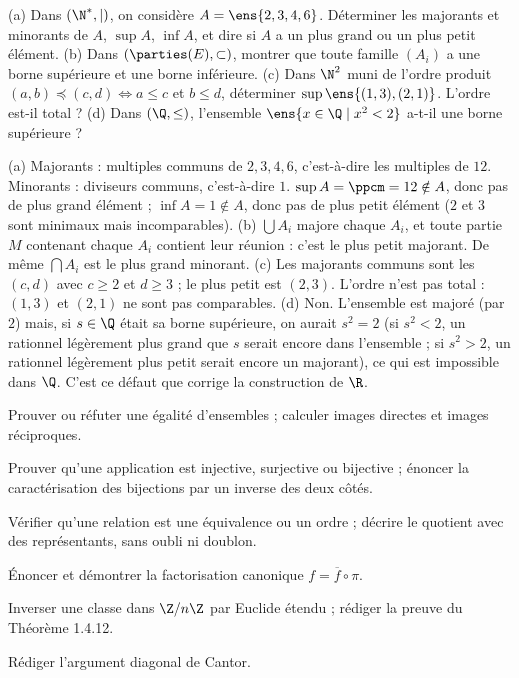 \begin{exo}
(a) Dans $(\N^*,\mid)$, on considère $A=\ens{2,3,4,6}$. Déterminer les majorants et minorants de $A$, $\sup A$, $\inf A$, et dire si $A$ a un plus grand ou un plus petit élément.
(b) Dans $(\parties(E),\subset)$, montrer que toute famille $(A_i)$ a une borne supérieure et une borne inférieure.
(c) Dans $\N^2$ muni de l'ordre produit $(a,b)\preceq(c,d)\iff a\le c$ et $b\le d$, déterminer $\sup\ens{(1,3),(2,1)}$. L'ordre est-il total ?
(d) Dans $(\Q,\le)$, l'ensemble $\ens{x\in\Q\mid x^2<2}$ a-t-il une borne supérieure ?
\begin{corrige}
(a) Majorants : multiples communs de $2,3,4,6$, c'est-à-dire les multiples de $12$. Minorants : diviseurs communs, c'est-à-dire $1$. $\sup A=\ppcm=12\notin A$, donc pas de plus grand élément ; $\inf A=1\notin A$, donc pas de plus petit élément ($2$ et $3$ sont minimaux mais incomparables).
(b) $\bigcup A_i$ majore chaque $A_i$, et toute partie $M$ contenant chaque $A_i$ contient leur réunion : c'est le plus petit majorant. De même $\bigcap A_i$ est le plus grand minorant.
(c) Les majorants communs sont les $(c,d)$ avec $c\ge2$ et $d\ge3$ ; le plus petit est $(2,3)$. L'ordre n'est pas total : $(1,3)$ et $(2,1)$ ne sont pas comparables.
(d) Non. L'ensemble est majoré (par $2$) mais, si $s\in\Q$ était sa borne supérieure, on aurait $s^2=2$ (si $s^2<2$, un rationnel légèrement plus grand que $s$ serait encore dans l'ensemble ; si $s^2>2$, un rationnel légèrement plus petit serait encore un majorant), ce qui est impossible dans $\Q$. C'est ce défaut que corrige la construction de $\R$.
\end{corrige}
\end{exo}

\begin{bilan}
\item Prouver ou réfuter une égalité d'ensembles ; calculer images directes et images réciproques.
\item Prouver qu'une application est injective, surjective ou bijective ; énoncer la caractérisation des bijections par un inverse des deux côtés.
\item Vérifier qu'une relation est une équivalence ou un ordre ; décrire le quotient avec des représentants, sans oubli ni doublon.
\item Énoncer et démontrer la factorisation canonique $f=\overline f\circ\pi$.
\item Inverser une classe dans $\Z/n\Z$ par Euclide étendu ; rédiger la preuve du Théorème 1.4.12.
\item Rédiger l'argument diagonal de Cantor.
\end{bilan}
